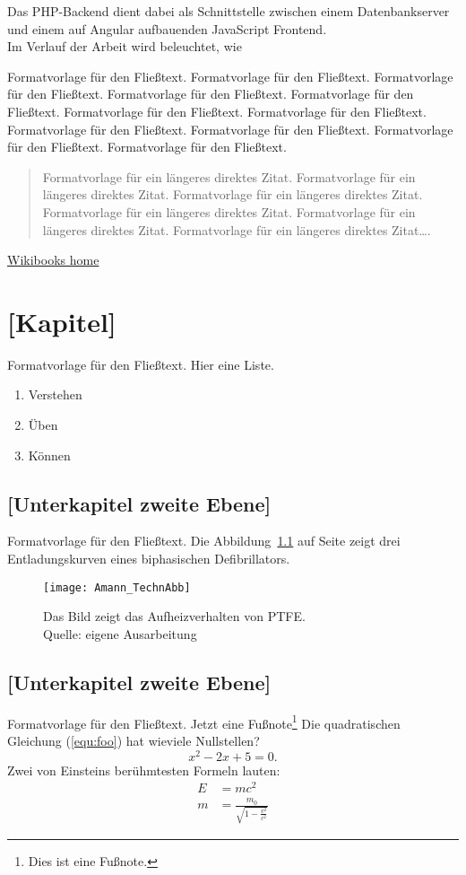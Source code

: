 \documentclass[a4paper,12pt,twoside]{scrreprt}
\begin{document}
Das PHP-Backend dient dabei als Schnittstelle zwischen einem Datenbankserver und einem auf Angular aufbauenden JavaScript Frontend.\\
Im Verlauf der Arbeit wird beleuchtet, wie 

Formatvorlage für den Fließtext. Formatvorlage für den Fließtext. Formatvorlage für den Fließtext. Formatvorlage für den Fließtext. Formatvorlage für den Fließtext. Formatvorlage für den Fließtext. Formatvorlage für den Fließtext. Formatvorlage für den Fließtext. Formatvorlage für den Fließtext. Formatvorlage für den Fließtext. Formatvorlage für den Fließtext.
\begin{quote}
  Formatvorlage für ein längeres direktes Zitat. Formatvorlage für ein längeres direktes Zitat. Formatvorlage für ein längeres direktes Zitat. Formatvorlage für ein längeres direktes Zitat. Formatvorlage für ein längeres direktes Zitat. Formatvorlage für ein längeres direktes Zitat….
\end{quote}

\href{https://www.wikibooks.org}{Wikibooks home}

\chapter{[Kapitel]}
Formatvorlage für den Fließtext.
Hier eine Liste.
\begin{enumerate}
 \item Verstehen
 \item Üben
 \item Können
\end{enumerate}


\section{[Unterkapitel zweite Ebene]}
Formatvorlage für den Fließtext. Die Abbildung~\ref{fig:ex} auf Seite \pageref{fig:ex} zeigt drei Entladungskurven eines biphasischen Defibrillators.
\begin{figure}[htb]
  \centering
  \texttt{[image: Amann\_TechnAbb]}
  \caption[Aufheizverhalten von PTFE]{Das Bild zeigt das Aufheizverhalten von PTFE. \\Quelle: eigene Ausarbeitung}
 \label{fig:ex}
\end{figure}


\section{[Unterkapitel zweite Ebene]}
Formatvorlage für den Fließtext.
Jetzt eine Fußnote\footnote{Dies ist eine Fußnote.}
Die quadratischen Gleichung (\ref{equ:foo}) hat wieviele Nullstellen?
\begin{equation}
 \label{equ:foo}
 x^2-2x+5=0.
\end{equation}
Zwei von Einsteins berühmtesten Formeln lauten:
\begin{eqnarray*}
  E &= mc^2                                  \\
  m &= \frac{m_0}{\sqrt{1-\frac{v^2}{c^2}}}
\end{eqnarray*}
\end{document}
